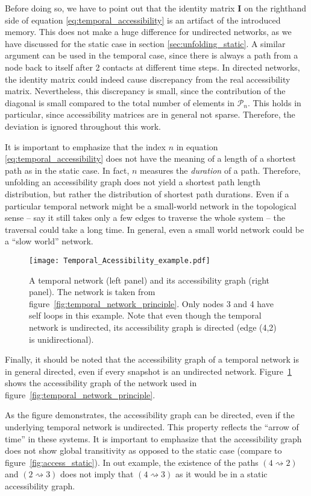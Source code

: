 Before doing so, we have to point out that the identity matrix $\mathbf{I}$ on the righthand side of equation \eqref{eq:temporal_accessibility} is an artifact of the introduced memory.
This does not make a huge difference for undirected networks, as we have discussed for the static case in section \ref{sec:unfolding_static}.
A similar argument can be used in the temporal case, since there is always a path from a node back to itself after 2 contacts at different time steps.
In directed networks, the identity matrix could indeed cause discrepancy from the real accessibility matrix.
Nevertheless, this discrepancy is small, since the contribution of the diagonal is small compared to the total number of elements in $\mathcal{P}_n$.
This holds in particular, since accessibility matrices are in general not sparse.
Therefore, the deviation is ignored throughout this work.

It is important to emphasize that the index $n$ in equation \eqref{eq:temporal_accessibility} does not have the meaning of a length of a shortest path as in the static case.
In fact, $n$ measures the \emph{duration} of a path.
Therefore, unfolding an accessibility graph does not yield a shortest path length distribution, but rather the distribution of shortest path durations.
Even if a particular temporal network might be a small-world network in the topological sense -- say it still takes only a few edges to traverse the whole system -- the traversal could take a long time.
In general, even a small world network could be a ``slow world'' network. 

\begin{figure}[htb]
\begin{center}
\texttt{[image: Temporal\_Acessibility\_example.pdf]}
\caption{A temporal network (left panel) and its accessibility graph (right panel).
The network is taken from figure~\ref{fig:temporal_network_principle}.
Only nodes 3 and 4 have self loops in this example.
Note that even though the temporal network is undirected, its accessibility graph is directed (edge (4,2) is unidirectional).}
\label{fig:temp_acc_example}
\end{center}
\end{figure}
%
Finally, it should be noted that the accessibility graph of a temporal network is in general directed, even if every snapshot is an undirected network.
Figure~\ref{fig:temp_acc_example} shows the accessibility graph of the network used in figure~\ref{fig:temporal_network_principle}.

As the figure demonstrates, the accessibility graph can be directed, even if the underlying temporal network is undirected.
This property reflects the ``arrow of time'' in these systems.
It is important to emphasize that the accessibility graph does not show global transitivity as opposed to the static case (compare to figure~\ref{fig:access_static}).
In out example, the existence of the paths $(4\rightsquigarrow 2)$ and $(2\rightsquigarrow 3)$ does not imply that $(4\rightsquigarrow 3)$ as it would be in a static accessibility graph.
 
